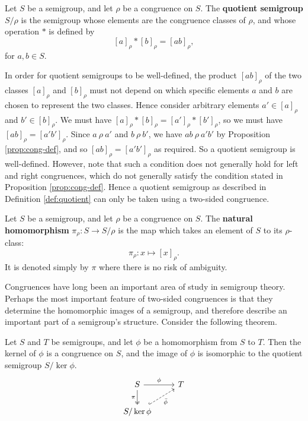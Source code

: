 \begin{definition}
  \label{def:quotient}
  Let $S$ be a semigroup, and let $\rho$ be a congruence on $S$.  The
  \textbf{quotient semigroup} $S / \rho$ is the semigroup whose elements are the
  congruence classes of $\rho$, and whose operation $*$ is defined by
  $$[a]_\rho * [b]_\rho = [ab]_\rho,$$
  for $a, b \in S$.
\end{definition}

In order for quotient semigroups to be well-defined, the product $[ab]_\rho$ of
the two classes $[a]_\rho$ and $[b]_\rho$ must not depend on which specific
elements $a$ and $b$ are chosen to represent the two classes.  Hence consider
arbitrary elements $a' \in [a]_\rho$ and $b' \in [b]_\rho$.  We must have
$[a]_\rho * [b]_\rho = [a']_\rho * [b']_\rho$, so we must have
$[ab]_\rho = [a'b']_\rho$.  Since $a ~\rho~ a'$ and $b ~\rho~ b'$, we have
$ab ~\rho~ a'b'$ by Proposition \ref{prop:cong-def}, and so
$[ab]_\rho = [a'b']_\rho$ as required.  So a quotient semigroup is well-defined.
However, note that such a condition does not generally hold for left and right
congruences, which do not generally satisfy the condition stated in Proposition
\ref{prop:cong-def}.  Hence a quotient semigroup as described in Definition
\ref{def:quotient} can only be taken using a two-sided congruence.

\begin{definition}
  \label{def:natural-homomorphism}
  Let $S$ be a semigroup, and let $\rho$ be a congruence on $S$.  The
  \textbf{natural homomorphism} $\pi_\rho: S \to S / \rho$ is the map which
  takes an element of $S$ to its $\rho$-class:
  $$\pi_\rho: x \mapsto [x]_\rho.$$
  It is denoted simply by $\pi$ where there is no risk of ambiguity.
\end{definition}

Congruences have long been an important area of study in semigroup theory.
Perhaps the most important feature of two-sided congruences is that they
determine the homomorphic images of a semigroup, and therefore describe an
important part of a semigroup's structure.  Consider the following theorem.

\begin{theorem}
  \label{thm:first-isomorphism}
  Let $S$ and $T$ be semigroups, and let $\phi$ be a homomorphism from $S$ to
  $T$.  Then the kernel of $\phi$ is a congruence on $S$, and the image of
  $\phi$ is isomorphic to the quotient semigroup $S / \ker{\phi}$.
  $$
  \begin{tikzcd}
    S \ar[d, two heads, "\pi"'] \ar[r, "\phi"] & T \\
    S / \ker{\phi} \ar[ur, dashed, hook, "\bar\phi"']
  \end{tikzcd}
  $$
\end{theorem}

